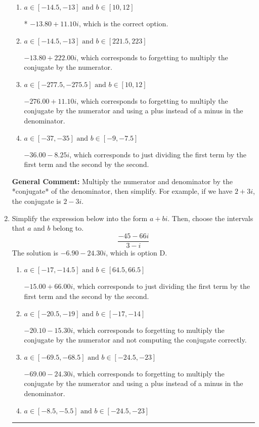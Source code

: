 \documentclass{extbook}[14pt]
\newcommand{\litem}[1]{\item #1

\rule{\textwidth}{0.4pt}}
\begin{document}
\begin{enumerate}
{\begin{enumerate}[label=\Alph*.]
 $-0.60  - 17.70 i$, which corresponds to forgetting to multiply the conjugate by the numerator and not computing the conjugate correctly.
\item \( a \in [-14.5, -13] \text{ and } b \in [10, 12] \)

* $-13.80  + 11.10 i$, which is the correct option.
\item \( a \in [-14.5, -13] \text{ and } b \in [221.5, 223] \)

 $-13.80  + 222.00 i$, which corresponds to forgetting to multiply the conjugate by the numerator.
\item \( a \in [-277.5, -275.5] \text{ and } b \in [10, 12] \)

 $-276.00  + 11.10 i$, which corresponds to forgetting to multiply the conjugate by the numerator and using a plus instead of a minus in the denominator.
\item \( a \in [-37, -35] \text{ and } b \in [-9, -7.5] \)

 $-36.00  - 8.25 i$, which corresponds to just dividing the first term by the first term and the second by the second.
\end{enumerate}

\textbf{General Comment:} Multiply the numerator and denominator by the *conjugate* of the denominator, then simplify. For example, if we have $2+3i$, the conjugate is $2-3i$.
}
\litem{
Simplify the expression below into the form $a+bi$. Then, choose the intervals that $a$ and $b$ belong to.
\[ \frac{-45 - 66 i}{3 - i} \]The solution is \( -6.90  - 24.30 i \), which is option D.\begin{enumerate}[label=\Alph*.]
\item \( a \in [-17, -14.5] \text{ and } b \in [64.5, 66.5] \)

 $-15.00  + 66.00 i$, which corresponds to just dividing the first term by the first term and the second by the second.
\item \( a \in [-20.5, -19] \text{ and } b \in [-17, -14] \)

 $-20.10  - 15.30 i$, which corresponds to forgetting to multiply the conjugate by the numerator and not computing the conjugate correctly.
\item \( a \in [-69.5, -68.5] \text{ and } b \in [-24.5, -23] \)

 $-69.00  - 24.30 i$, which corresponds to forgetting to multiply the conjugate by the numerator and using a plus instead of a minus in the denominator.
\item \( a \in [-8.5, -5.5] \text{ and } b \in [-24.5, -23] \)


\end{enumerate}}
\end{enumerate}
\end{document}
